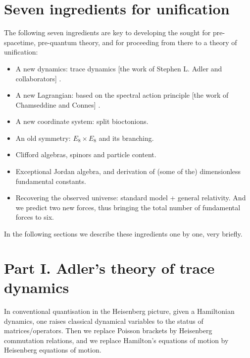 \documentclass{iopconfser}
\begin{document}
\section{Seven ingredients for unification}
The following seven ingredients are key to developing the sought for pre-spacetime, pre-quantum theory, and for proceeding from there to a theory of unification:

\begin{itemize}

\item  A new dynamics: trace dynamics [the work of Stephen L. Adler and collaborators] \cite{Adler}.

\item A new Lagrangian: based on the spectral action principle [the work of Chamseddine and Connes] \cite{CC}.

\item A new coordinate system: split bioctonions.

\item An old symmetry: $E_8 \times E_8$ and its branching.

\item Clifford algebras, spinors and particle content.

\item Exceptional Jordan algebra, and derivation of (some of the) dimensionless fundamental constants.

\item Recovering the observed universe: standard model + general relativity. And we predict two new forces, thus bringing the total number of fundamental forces to six.

\end{itemize}

In the following sections we describe these ingredients one by one,  very briefly.

\section{Part I. Adler's theory of trace dynamics}

In conventional quantisation in the Heisenberg picture, given a Hamiltonian dynamics, one raises classical dynamical variables to the status of matrices/operators.
Then we replace Poisson brackets by Heisenberg commutation relations,
and we replace Hamilton’s equations of motion by Heisenberg equations of motion.
\end{document}
